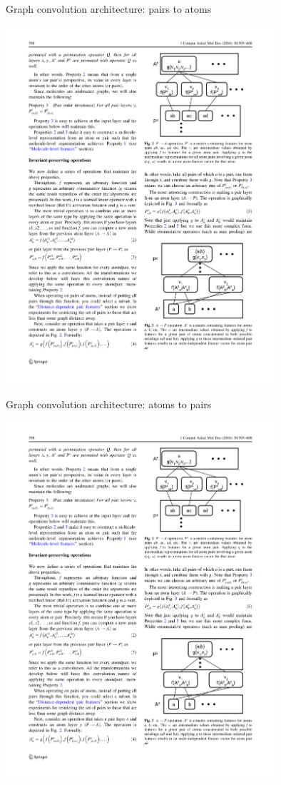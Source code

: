 \documentclass[compress]{beamer}
\begin{document}
\begin{frame}{Graph convolution architecture: pairs to atoms}
  \begin{center}
    \includegraphics[width=0.75\textwidth]{./figures/gc_fig2.pdf}
  \end{center}
\end{frame}

\begin{frame}{Graph convolution architecture: atoms to pairs}
  \begin{center}
    \includegraphics[width=0.75\textwidth]{./figures/gc_fig3.pdf}
  \end{center}
\end{frame}
\end{document}

